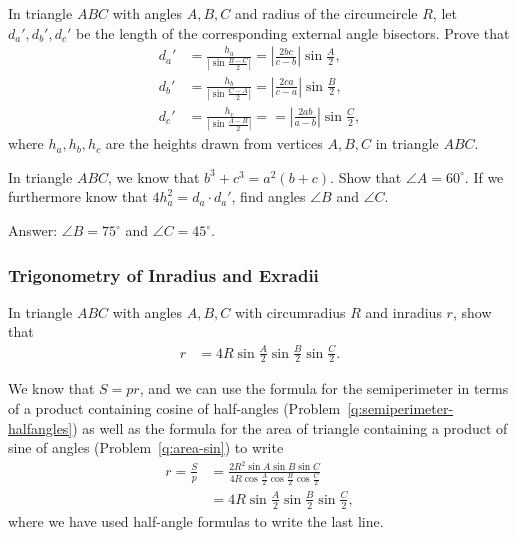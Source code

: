 \documentclass[12pt,a4paper]{memoir}
\theoremstyle{definition}
\begin{document}
	\begin{question}[name=Calculating the Length of External Angle Bisectors]
		In triangle $ABC$ with angles $A,B,C$ and radius of the circumcircle $R$, let $d_a',d_b',d_c'$ be the length of the corresponding external angle bisectors. Prove that
		\begin{align*}
			d_a' &= \displaystyle \frac{h_a}{\displaystyle\left|\sin\frac{B-C}{2}\right|}=\left|\frac{2bc}{c-b}\right|\sin\frac{A}{2},\\
			d_b' &= \displaystyle \frac{h_b}{\displaystyle\left|\sin\frac{C-A}{2}\right|}=\left|\frac{2ca}{c-a}\right|\sin\frac{B}{2},\\
			d_c' &= \displaystyle \frac{h_c}{\displaystyle\left|\sin\frac{A-B}{2}\right|}==\left|\frac{2ab}{a-b}\right|\sin\frac{C}{2},
		\end{align*}
		where $h_a,h_b,h_c$ are the heights drawn from vertices $A,B,C$ in triangle $ABC$.
	\end{question}



\begin{question}
	In triangle $ABC$, we know that $b^3+c^3 = a^2(b+c).$ Show that $\angle A = 60^\circ$. If we furthermore know that $4h_a^2=d_a\cdot d_a'$, find angles $\angle B$ and $\angle C$.
\end{question}

\begin{solution}
	Answer: $\angle B = 75^{\circ}$ and $\angle C = 45^{\circ}$.
\end{solution}


\subsubsection{Trigonometry of Inradius and Exradii}


	\begin{question}[name=Calculating the Inradius]
		In triangle $ABC$ with angles $A,B,C$ with circumradius $R$ and inradius $r$, show that
		\begin{align*}
			r &= 4R\sin\frac{A}{2}\sin\frac{B}{2}\sin\frac{C}{2}.
		\end{align*}
	\end{question}




\begin{solution}[name=Calculating the Inradius]
	We know that $S=pr$, and we can use the formula for the semiperimeter in terms of a product containing cosine of half-angles (Problem~\ref{q:semiperimeter-halfangles}) as well as the formula for the area of triangle containing a product of sine of angles (Problem~\ref{q:area-sin}) to write
	\begin{align*}
		r = \frac{S}{p} &= \frac{2R^2 \sin A \sin B \sin C}{4R\cos\frac{A}{2}\cos\frac{B}{2}\cos\frac{C}{2}}\\
		&= 4R\sin\frac{A}{2}\sin\frac{B}{2}\sin\frac{C}{2},
	\end{align*}
	where we have used half-angle formulas to write the last line.
\end{solution}
\end{document}
